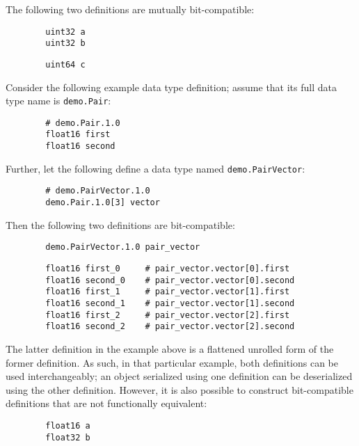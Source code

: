\begin{remark}[breakable]
    The following two definitions are mutually bit-compatible:

    \begin{verbatim}
        uint32 a
        uint32 b
    \end{verbatim}

    \begin{verbatim}
        uint64 c
    \end{verbatim}

    Consider the following example data type definition; assume that its full data type name is
    \verb|demo.Pair|:

    \begin{verbatim}
        # demo.Pair.1.0
        float16 first
        float16 second
    \end{verbatim}

    Further, let the following define a data type named \verb|demo.PairVector|:

    \begin{verbatim}
        # demo.PairVector.1.0
        demo.Pair.1.0[3] vector
    \end{verbatim}

    Then the following two definitions are bit-compatible:

    \begin{verbatim}
        demo.PairVector.1.0 pair_vector
    \end{verbatim}

    \begin{verbatim}
        float16 first_0     # pair_vector.vector[0].first
        float16 second_0    # pair_vector.vector[0].second
        float16 first_1     # pair_vector.vector[1].first
        float16 second_1    # pair_vector.vector[1].second
        float16 first_2     # pair_vector.vector[2].first
        float16 second_2    # pair_vector.vector[2].second
    \end{verbatim}

    The latter definition in the example above is a flattened unrolled form of the former definition.
    As such, in that particular example, both definitions can be used interchangeably;
    an object serialized using one definition can be deserialized using the other definition.
    However, it is also possible to construct bit-compatible definitions that are not functionally equivalent:

    \begin{verbatim}
        float16 a
        float32 b
    \end{verbatim}


\end{remark}
